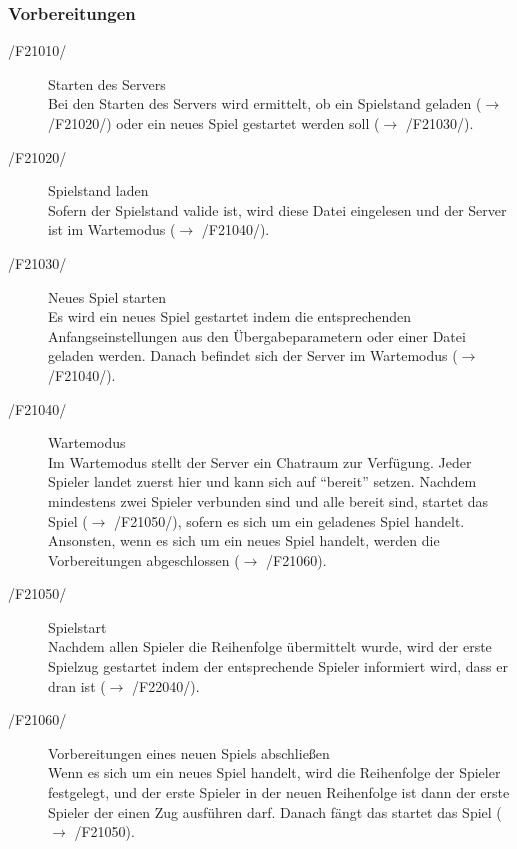 \documentclass[a4paper,10pt]{article}
\begin{document}
\subsubsection{Vorbereitungen}
\begin{description}
\item[/F21010/] Starten des Servers \\
Bei den Starten des Servers wird ermittelt, ob ein Spielstand geladen ($\rightarrow$ /F21020/) oder ein neues Spiel gestartet werden soll ($\rightarrow$ /F21030/).
\item[/F21020/] Spielstand laden \\
Sofern der Spielstand valide ist, wird diese Datei eingelesen und der Server ist im Wartemodus ($\rightarrow$ /F21040/).
\item[/F21030/] Neues Spiel starten \\
Es wird ein neues Spiel gestartet indem die entsprechenden Anfangseinstellungen aus den Übergabeparametern oder einer Datei geladen werden. Danach befindet sich der Server im Wartemodus ($\rightarrow$ /F21040/).
\item[/F21040/] Wartemodus \\
Im Wartemodus stellt der Server ein Chatraum zur Verfügung. Jeder Spieler landet zuerst hier und kann sich auf "`bereit"' setzen. Nachdem mindestens zwei Spieler verbunden sind und alle bereit sind, startet das Spiel ($\rightarrow$ /F21050/), sofern es sich um ein geladenes Spiel handelt. Ansonsten, wenn es sich um ein neues Spiel handelt, werden die Vorbereitungen abgeschlossen ($\rightarrow$ /F21060).
\item[/F21050/] Spielstart \\
Nachdem allen Spieler die Reihenfolge übermittelt wurde, wird der erste Spielzug gestartet indem der entsprechende Spieler informiert wird, dass er dran ist ($\rightarrow$ /F22040/).
\item[/F21060/] Vorbereitungen eines neuen Spiels abschließen \\
Wenn es sich um ein neues Spiel handelt, wird die Reihenfolge der Spieler festgelegt, und der erste Spieler in der neuen Reihenfolge ist dann der erste Spieler der einen Zug ausführen darf. Danach fängt das startet das Spiel ($\rightarrow$ /F21050).
\end{description}
\newpage
\end{document}
